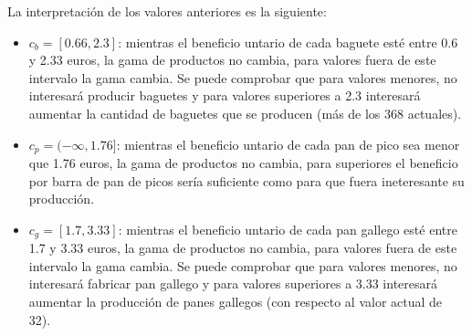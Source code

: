 La interpretación de los valores anteriores es la siguiente:
\begin{itemize}
    \item $c_b = [0.66, 2.3]$: mientras el beneficio untario de cada baguete esté entre 0.6 y 2.33 euros, la gama de productos no cambia, para valores fuera de este intervalo la gama cambia. Se puede comprobar que para valores menores, no interesará producir baguetes y para valores superiores a 2.3 interesará aumentar la cantidad de baguetes que se producen (más de los 368 actuales).
    \item $c_p = (-\infty, 1.76]$: mientras el beneficio untario de cada pan de pico sea menor que 1.76 euros, la gama de productos no cambia, para superiores el beneficio por barra de pan de picos sería suficiente como para que fuera ineteresante su producción. 
    \item $c_g = [1.7, 3.33]$: mientras el beneficio untario de cada pan gallego esté entre 1.7 y 3.33 euros, la gama de productos no cambia, para valores fuera de este intervalo la gama cambia. Se puede comprobar que para valores menores, no interesará fabricar pan gallego y para valores superiores a 3.33 interesará aumentar la producción de panes gallegos (con respecto al valor actual de 32).
\end{itemize}



